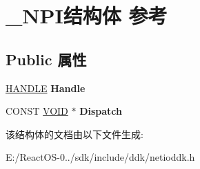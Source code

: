 \hypertarget{struct___n_p_i}{}\section{\+\_\+\+N\+P\+I结构体 参考}
\label{struct___n_p_i}
\subsection*{Public 属性}
\begin{DoxyCompactItemize}
\item 
\mbox{\label{struct___n_p_i_add8b99d5d05b2f9d4cbc91b850e874fc}} 
\hyperlink{interfacevoid}{H\+A\+N\+D\+LE} {\bfseries Handle}
\item 
\mbox{\label{struct___n_p_i_ab48984283629f914f7f825a9c96e3299}} 
C\+O\+N\+ST \hyperlink{interfacevoid}{V\+O\+ID} $\ast$ {\bfseries Dispatch}
\end{DoxyCompactItemize}


该结构体的文档由以下文件生成\+:\begin{DoxyCompactItemize}
\item 
E\+:/\+React\+O\+S-\/0../sdk/include/ddk/netioddk.\+h\end{DoxyCompactItemize}
